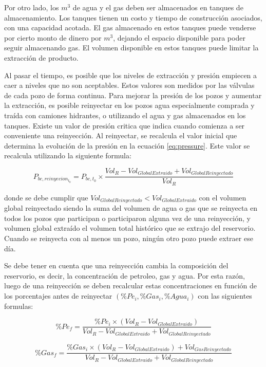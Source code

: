\documentclass[10pt,a4paper]{article}
\begin{document}
Por otro lado, los $m^3$ de agua y el gas deben ser almacenados en tanques de almacenamiento. Los tanques tienen un costo y tiempo de construcción asociados, con una capacidad acotada. El gas almacenado en estos tanques puede venderse por cierto monto de dinero por $m^3$, dejando el espacio disponible para poder seguir almacenando gas. El volumen disponible en estos tanques puede limitar la extracción de producto.

Al pasar el tiempo, es posible que los niveles de extracción y presión empiecen a caer a niveles que no son aceptables. Estos valores son medidos por las válvulas de cada pozo de forma continua. Para mejorar la presión de los pozos y aumentar la extracción, es posible reinyectar en los pozos agua especialmente comprada y traída con camiones hidrantes, o utilizando el agua y gas almacenados en los tanques. Existe un valor de presión critica que indica cuando comienza a ser conveniente una reinyección. Al reinyectar, se recalcula el valor inicial que determina la evolución de la presión en la ecuación \ref{eq:pressure}. Este valor se recalcula utilizando la siguiente formula:

\begin{equation}
P_{bc, reinyecion_{t_0}} = P_{bc, t_0} \times \frac{Vol_R - Vol_{GlobalExtraido} + Vol_{GlobalReinyectado}}{Vol_R}
\end{equation}

donde se debe cumplir que $Vol_{GlobalReinyectado} < Vol_{GlobalExtraido}$ con el volumen global reinyectado siendo la suma del volumen de agua o gas que se reinyecta en todos los pozos que participan o participaron alguna vez de una reinyección, y volumen global extraído el volumen total histórico que se extrajo del reservorio. Cuando se reinyecta con al menos un pozo, ningún otro pozo puede extraer ese día. 

Se debe tener en cuenta que una reinyección cambia la composición del reservorio, es decir, la concentración de petroleo, gas y agua. Por esta razón, luego de una reinyección se deben recalcular estas concentraciones en función de los porcentajes antes de reinyectar $(\%Pe_i, \%Gas_i, \%Agua_i)$ con las siguientes formulas:

\begin{equation}
\%Pe_f = \frac{\%Pe_i \times (Vol_R - Vol_{GlobalExtraido})}{Vol_R - Vol_{GlobalExtraido} + Vol_{GlobalReinyectado}}
\end{equation}

\begin{equation}
\%Gas_f = \frac{\%Gas_i \times (Vol_R - Vol_{GlobalExtraido}) + Vol_{GasReinyectado}}{Vol_R - Vol_{GlobalExtraido} + Vol_{GlobalReinyectado}}
\end{equation}
\end{document}
